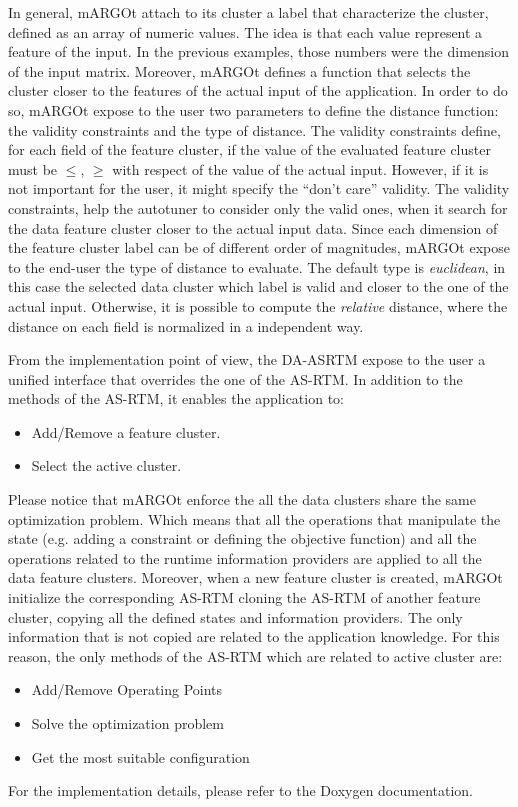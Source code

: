 In general, mARGOt attach to its cluster a label that characterize the cluster, defined as an array of numeric values.
The idea is that each value represent a feature of the input.
In the previous examples, those numbers were the dimension of the input matrix.
Moreover, mARGOt defines a function that selects the cluster closer to the features of the actual input of the application.
In order to do so, mARGOt expose to the user two parameters to define the distance function: the validity constraints and the type of distance.
The validity constraints define, for each field of the feature cluster, if the value of the evaluated feature cluster must be $\leq$, $\geq$ with respect of the value of the actual input.
However, if it is not important for the user, it might specify the ``don't care'' validity.
The validity constraints, help the autotuner to consider only the valid ones, when it search for the data feature cluster closer to the actual input data.
Since each dimension of the feature cluster label can be of different order of magnitudes, mARGOt expose to the end-user the type of distance to evaluate.
The default type is \textit{euclidean}, in this case the selected data cluster which label is valid and closer to the one of the actual input.
Otherwise, it is possible to compute the \textit{relative} distance, where the distance on each field is normalized in a independent way.


From the implementation point of view, the DA-ASRTM expose to the user a unified interface that overrides the one of the AS-RTM.
In addition to the methods of the AS-RTM, it enables the application to:
\begin{itemize}
	\item Add/Remove a feature cluster.
	\item Select the active cluster.
\end{itemize}
Please notice that mARGOt enforce the all the data clusters share the same optimization problem.
Which means that all the operations that manipulate the state (e.g. adding a constraint or defining the objective function) and all the operations related to the runtime information providers are applied to all the data feature clusters.
Moreover, when a new feature cluster is created, mARGOt initialize the corresponding AS-RTM cloning the AS-RTM of another feature cluster, copying all the defined states and information providers.
The only information that is not copied are related to the application knowledge.
For this reason, the only methods of the AS-RTM which are related to active cluster are:
\begin{itemize}
	\item Add/Remove Operating Points
	\item Solve the optimization problem
	\item Get the most suitable configuration
\end{itemize}
For the implementation details, please refer to the Doxygen documentation.